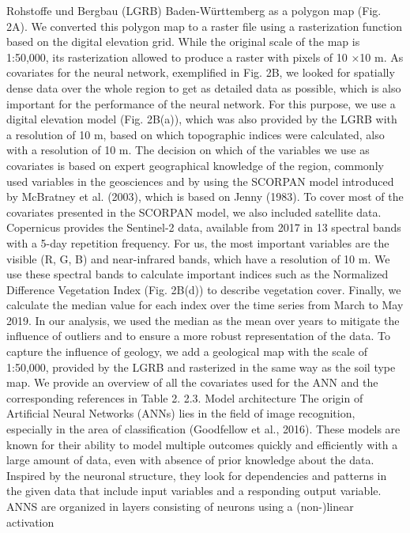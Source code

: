 Rohstoffe und Bergbau (LGRB) Baden-Württemberg as a polygon map
(Fig. 2A). We converted this polygon map to a raster file using a rasterization
function based on the digital elevation grid. While the original
scale of the map is 1:50,000, its rasterization allowed to produce a raster
with pixels of 10 ×10 m. As covariates for the neural network, exemplified
in Fig. 2B, we looked for spatially dense data over the whole
region to get as detailed data as possible, which is also important for the
performance of the neural network. For this purpose, we use a digital
elevation model (Fig. 2B(a)), which was also provided by the LGRB with
a resolution of 10 m, based on which topographic indices were calculated,
also with a resolution of 10 m. The decision on which of the
variables we use as covariates is based on expert geographical knowledge
of the region, commonly used variables in the geosciences and by
using the SCORPAN model introduced by McBratney et al. (2003),
which is based on Jenny (1983). To cover most of the covariates presented
in the SCORPAN model, we also included satellite data. Copernicus
provides the Sentinel-2 data, available from 2017 in 13 spectral
bands with a 5-day repetition frequency. For us, the most important
variables are the visible (R, G, B) and near-infrared bands, which have a
resolution of 10 m. We use these spectral bands to calculate important
indices such as the Normalized Difference Vegetation Index (Fig. 2B(d))
to describe vegetation cover. Finally, we calculate the median value for
each index over the time series from March to May 2019. In our analysis,
we used the median as the mean over years to mitigate the influence of
outliers and to ensure a more robust representation of the data. To
capture the influence of geology, we add a geological map with the scale
of 1:50,000, provided by the LGRB and rasterized in the same way as the
soil type map. We provide an overview of all the covariates used for the
ANN and the corresponding references in Table 2.
2.3. Model architecture
The origin of Artificial Neural Networks (ANNs) lies in the field of
image recognition, especially in the area of classification (Goodfellow
et al., 2016). These models are known for their ability to model multiple
outcomes quickly and efficiently with a large amount of data, even with
absence of prior knowledge about the data. Inspired by the neuronal
structure, they look for dependencies and patterns in the given data that
include input variables and a responding output variable. ANNS are
organized in layers consisting of neurons using a (non-)linear activation
